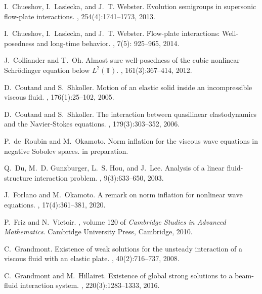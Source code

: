 \documentclass[letterpaper, 11pt,  reqno]{amsart}
\newcommand{\1}{\hspace{0.5mm}\text{I}\hspace{0.2mm}}
\numberwithin{equation}{section}
\numberwithin{theorem}{section}
\begin{document}
\begin{thebibliography}{10}
I.~Chueshov, I.~Lasiecka, and J.~T. Webster.
\newblock Evolution semigroups in supersonic flow-plate interactions.
, 254(4):1741--1773, 2013.

I.~Chueshov, I.~Lasiecka, and J.~T. Webster.
\newblock Flow-plate interactions: {W}ell-posedness and long-time behavior.
, 7(5): 925--965, 2014.

J.~Colliander and T.~Oh.
\newblock Almost sure well-posedness of the cubic nonlinear {S}chr\"{o}dinger
  equation below $L^{2}(\mathbb{T})$.
, 161(3):367--414, 2012.

D.~Coutand and S.~Shkoller.
\newblock Motion of an elastic solid inside an incompressible viscous fluid.
, 176(1):25--102, 2005.

D.~Coutand and S.~Shkoller.
\newblock The interaction between quasilinear elastodynamics and the
  {N}avier-{S}tokes equations.
, 179(3):303--352, 2006.

P.~de~Roubin and M.~Okamoto.
\newblock Norm inflation for the viscous wave equations in negative Sobolev
  spaces.
\newblock in preparation.

Q.~Du, M.~D. Gunzburger, L.~S. Hou, and J.~Lee.
\newblock Analysis of a linear fluid-structure interaction problem.
, 9(3):633--650, 2003.

J.~Forlano and M.~Okamoto.
\newblock A remark on norm inflation for nonlinear wave equations.
, 17(4):361--381, 2020.

P.~Friz and N.~Victoir.
, volume 120 of {\em Cambridge Studies in Advanced
  Mathematics}.
\newblock Cambridge University Press, Cambridge, 2010.

C.~Grandmont.
\newblock Existence of weak solutions for the unsteady interaction of a viscous
  fluid with an elastic plate.
, 40(2):716--737, 2008.

C.~Grandmont and M.~Hillairet.
\newblock Existence of global strong solutions to a beam-fluid interaction
  system.
, 220(3):1283--1333, 2016.


\end{thebibliography}
\end{document}
